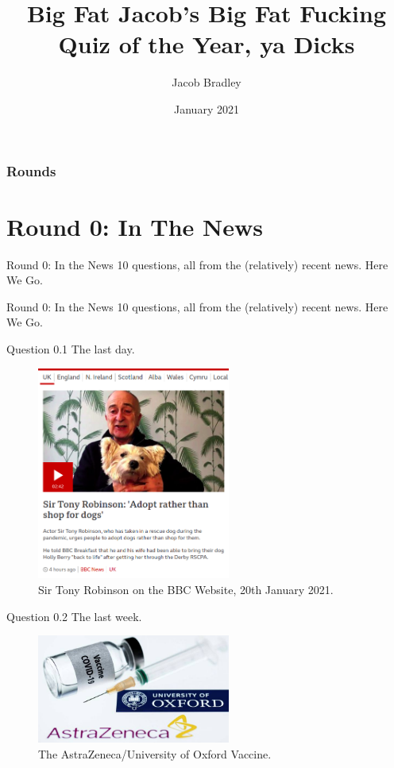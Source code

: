 \documentclass{beamer}
\title[Big Fat Jacob's Big Fat Quiz]{Big Fat Jacob's Big Fat Fucking Quiz of the Year, ya Dicks}
\author[Jacob Bradley]{Jacob Bradley}
\date{January 2021}
\begin{document}
\begin{frame}
\titlepage
\end{frame}



\begin{frame}
\frametitle{Rounds}
\tableofcontents
\end{frame}

\section{Round 0: In The News}


\begin{frame}{Round 0: In the News}
10 questions, all from the (relatively) recent news. Here We Go.
\end{frame}

\begin{frame}{Round 0: In the News}
10 questions, all from the (relatively) recent news. Here We Go.
\end{frame}

\begin{frame}{Question 0.1}
The last day.
\begin{figure}[htbp]
\centering
\includegraphics[width=2.5in]{tony.png}
\caption{Sir Tony Robinson on the BBC Website, 20th January 2021.}
\end{figure}
\end{frame}



\begin{frame}{Question 0.2}
The last week.
\begin{figure}[htbp]
\centering
\includegraphics[width=2.5in]{az.jpg}
\caption{The AstraZeneca/University of Oxford Vaccine.}
\end{figure}
\end{frame}
\end{document}

